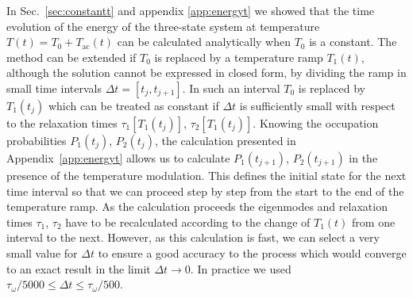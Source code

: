 \documentclass[pre,a4paper,twocolumn,superscriptaddress,%
floatfix]{revtex4}
\newcommand{\tac}{\ensuremath{T_{\mathrm{ac}}}}
\begin{document}
In Sec.~\ref{sec:constantt} and appendix
\ref{app:energyt} we showed that the time evolution of
the energy of the three-state system at temperature $T(t) = T_0 + \tac(t)$
can be calculated analytically when $T_0$ is a constant. The method can be
extended if $T_0$ is replaced by a temperature ramp $T_1(t)$, although the
solution cannot be expressed in closed form, by dividing the ramp in small
time intervals $\Delta t = [t_j , t_{j+1}]$. In such an interval $T_0$ is
replaced by $T_1(t_j)$ which can be treated as constant if $\Delta t$ is
sufficiently small with respect to the relaxation times $\tau_1[T_1(t_j)]$,
$\tau_2[T_1(t_j)]$. Knowing the occupation probabilities $P_1(t_j)$,
$P_2(t_j)$, the calculation presented in Appendix~\ref{app:energyt} allows us
to calculate  $P_1(t_{j+1})$, $P_2(t_{j+1})$ in the presence of the
temperature modulation. This defines the initial state for the next time
interval so that we can proceed step by step from the start to the end of the
temperature ramp. As the calculation proceeds the eigenmodes and
relaxation times $\tau_1$,
$\tau_2$ have to be recalculated according to the change of $T_1(t)$ from one
interval to the next. However, as this calculation is fast, we can select a very
small value for $\Delta t$ to ensure a good accuracy to the process which
would converge to an exact result in the limit $\Delta t \to 0$. In practice
we used $\tau_{\omega}/5000 \le \Delta t \le \tau_{\omega}/500$.
\end{document}

